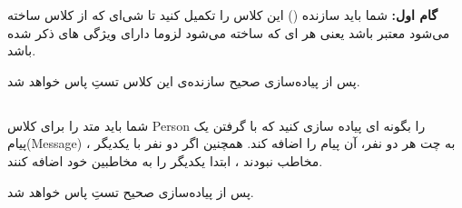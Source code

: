     
    \textbf{گام اول: }
    شما باید سازنده
    (\grayBox{\textcolor{navyBlue}{constructor}}) 
    این کلاس را تکمیل کنید تا شی‌ای که از کلاس ساخته می‌شود معتبر باشد یعنی هر 
    \grayBox{\textcolor{navyBlue}{Message}}ای 
    که ساخته می‌شود لزوما دارای ویژگی های ذکر شده باشد.
    
    پس از پیاده‌سازی صحیح سازنده‌ی این کلاس تستِ 
    \grayBox{\textcolor{dkgreen}{test\_MessageConstructor}}
    پاس خواهد شد.

    \subsection{ }
    شما باید متد
    \grayBox{\textcolor{navyBlue}{SendMessage}}
    را برای کلاس Person
    را بگونه ای پیاده سازی کنید 
    که با گرفتن یک پیام(Message)
    ،
    به چت هر دو نفر، آن پیام را اضافه کند.
    همچنین اگر دو نفر با یکدیگر مخاطب نبودند
،   
ابتدا
    یکدیگر را به مخاطبین خود اضافه کنند.
     
     
    پس از پیاده‌سازی صحیح تستِ 
    \grayBox{\textcolor{dkgreen}{test\_SendMessage}}
    پاس خواهد شد.